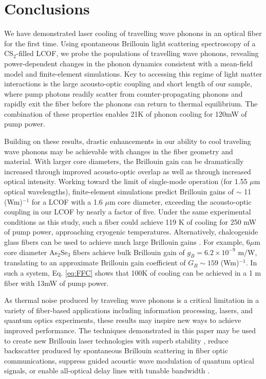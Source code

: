\section{Conclusions}
We have demonstrated laser cooling of travelling wave phonons in an optical fiber for the first time.  Using spontaneous Brillouin light scattering spectroscopy of a CS$_2$-filled LCOF, we probe the populations of travelling wave phonons, revealing power-dependent changes in the phonon dynamics consistent with a mean-field model and finite-element simulations. Key to accessing this regime of light matter interactions is the large acousto-optic coupling and short length of our sample, where pump photons readily scatter from counter-propagating phonons and rapidly exit the fiber before the phonons can return to thermal equilibrium. The combination of these properties enables 21K of phonon cooling for 120mW of pump power.

Building on these results, drastic enhancements in our ability to cool traveling wave phonons may be achievable with changes in the fiber geometry and material. With larger core diameters, the Brillouin gain can be dramatically increased through improved acousto-optic overlap as well as through increased optical intensity. Working toward the limit of single-mode operation (for 1.55 $\mu$m optical wavelengths), finite-element simulations predict Brillouin gains of $\sim$ 11 (Wm)$^{-1}$ for a LCOF with a 1.6 $\mu$m core diameter, exceeding the acousto-optic coupling in our LCOF by nearly a factor of five. Under the same experimental conditions as this study, such a fiber could achieve 119 K of cooling for 250 mW of pump power, approaching cryogenic temperatures. Alternatively, chalcogenide glass fibers can be used to achieve much large Brillouin gains \cite{abedin2005observation}. For example, $6 \mu$m core diameter As$_2$Se$_3$ fibers achieve bulk Brillouin gain of $g_B = 6.2 \times 10^{-9}$ m/W, translating to an approximate Brillouin gain coefficient of  $G_B \sim 159$ (Wm)$^{-1}$. In such a system, Eq. \eqref{eq:FFC} shows that 100K of cooling can be achieved in a 1 m fiber with 13mW of pump power.

As thermal noise produced by traveling wave phonons is a critical limitation in a variety of fiber-based applications including information processing, lasers, and quantum optics experiments, these results may inspire new ways to achieve improved performance.  The techniques demonstrated in this paper may be used to create new Brillouin laser technologies with superb stability \cite{behunin2018fundamental,li2012characterization}, reduce backscatter produced by spontaneous Brillouin scattering in fiber optic communications, suppress guided acoustic wave modulation of quantum optical signals, or enable all-optical delay lines with tunable bandwidth \cite{okawachi2005tunable}.

